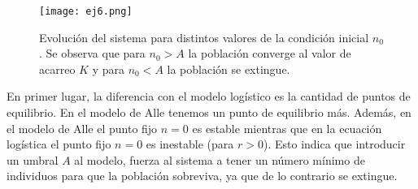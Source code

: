 \documentclass[letterpaper,12pt]{article}
\theoremstyle{plain}
\begin{document}
\begin{figure}[h]
    \centering
    \texttt{[image: ej6.png]}
    \caption{Evolución del sistema para distintos valores de la condición inicial $n_0$. Se observa que para $n_0>A$ la población converge al valor de acarreo $K$ y para $n_0<A$ la población se extingue.}
    \label{fig:ej6}
\end{figure}

En primer lugar, la diferencia con el modelo logístico es la cantidad de puntos de equilibrio. En el modelo de Alle tenemos un punto de equilibrio más. Además, en el modelo de Alle el punto fijo $n=0$ es estable mientras que en la ecuación logística el punto fijo $n=0$ es inestable (para $r>0$). Esto indica que introducir un umbral $A$ al modelo, fuerza al sistema a tener un número mínimo de individuos para que la población sobreviva, ya que de lo contrario se extingue. 

\end{document}
